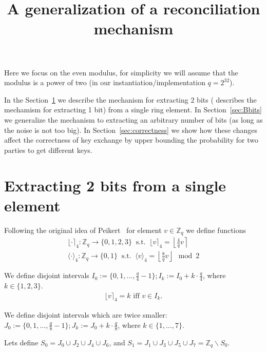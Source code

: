 \documentclass[12pt]{article}
\newcommand{\Z}{\mathbb{Z}}
\begin{document}
\title{A generalization of a reconciliation mechanism}
\maketitle

Here we focus on the even modulus, for simplicity we will assume that the modulus is a power of two (in our instantiation/implementation $q = 2^{32}$).

In the Section~\ref{sec:2bits} we describe the mechanism for extracting 2 bits (\cite{P14} describes the mechamism for extracting 1 bit) from a single ring element. In Section~\ref{sec:Bbits} we generalize the mechanism to extracting an arbitrary number of bits (as long as the noise is not too big). In Section~\ref{sec:correctness} we show how these changes affect the correctness of key exchange by upper bounding the probability for two parties to get different keys.

\section{Extracting 2 bits from a single element}
\label{sec:2bits}
Following the original idea of Peikert~\cite{P14} for element $v \in \Z_q$ we define functions
\begin{align*}
\lfloor \cdot \rceil_4: \Z_q \rightarrow \{0, 1, 2, 3\}\;\;\text{s.t.}\;\; \lfloor v \rceil_4 = \left\lfloor \frac{4}{q} v\right\rceil\\
\langle \cdot \rangle_4: \Z_q \rightarrow \{0, 1\}\;\;\text{s.t.}\;\; \langle v \rangle_4 = \left\lfloor \frac{8}{q} v \right\rfloor \mod 2
\end{align*}

We define disjoint intervals $I_0 := \{0, 1, \ldots, \frac{q}{4} - 1\}; I_k := I_0 + k \cdot \frac{q}{4}$, where $k \in \{1, 2, 3\}$.
\begin{align*}
\lfloor v \rceil_4 = k\text{ iff }v \in I_k.
\end{align*}

We define disjoint intervals which are twice smaller: $J_0 := \{0, 1, \ldots, \frac{q}{8} - 1\}; J_k := J_0 + k \cdot \frac{q}{8}$, where $k \in \{1, \ldots, 7\}$.

Lets define $S_0 = J_0 \cup J_2 \cup J_4 \cup J_6$, and $S_1 = J_1 \cup J_3 \cup J_5 \cup J_7 = \Z_q \backslash S_0$.
\end{document}
